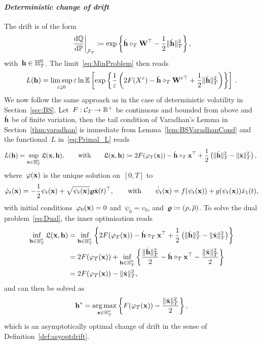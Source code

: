 \paragraph{\textit{Deterministic change of drift}}
The drift is of the form
$$ 
\left.\frac{\D\QQ}{\D\PP}\right|_{\Ff_T} \defEqual \exp\left\{\dot{\hh}\cT \Wf^\top - \frac{1}{2}\|\dot{\hh}\|_{T}^2\right\},
$$
with~$\hh\in \HH_T^0$.
The limit~\eqref{eq:MinProblem} %
then reads
$$
L(\hh) = \limsup_{\eps\downarrow 0}
\eps\ln\EE\left[
\exp\left\{\frac{1}{\eps}\left(2F(X^{\eps}) - \dot{\hh}\cT \Wf^{\eps\top} + \frac{1}{2}\|\dot{\hh}\|_{T}^2\right)\right\}
\right]\,.
$$
We now follow the same approach as in the case of deterministic volatility in Section~\ref{sec:BS}. 
Let~$F:\Cc_T\rightarrow\RR^+$ be continuous and bounded from above and~$\dot{\hh}$ be of finite variation, then the tail condition of Varadhan's Lemma in Section~\ref{thm:varadhan} is immediate from Lemma~\ref{lem:BSVaradhanCond} and 
the functional~$L$ in~\eqref{eq:Primal_L} reads
$$
L(\hh) = \sup\limits_{\xx\in \HH_T^0}
\Lf(\xx,\hh),
\qquad\text{with}\qquad
\Lf(\xx,\hh) \defEqual 2 F(\varphi_T(\xx)) - \dot{\hh}\cT \xx^\top
 + \half\left(\|\dot{\hh}\|_{T}^2 - \|\dot{\xx}\|_{T}^2\right),
~$$
where~$\varphi(\xx)$ is the unique solution on~$[0,T]$ to
$$
\dot{\varphi}_t(\xx) = -\frac{1}{2}\psi_t(\xx) + \sqrt{\psi_t(\xx)}\vrho\dot{\xx}(t)^\top,
\qquad\text{with}\qquad
\dot{\psi}_t(\xx) = f(\psi_t(\xx)) + g(\psi_t(\xx)) \dot{x}_1(t), %
$$
with initial conditions~$\varphi_0(\xx) = 0$ and~$\psi_0 = v_0$, and~$\vrho\defEqual(\rho, \brho)$. 
To solve the dual problem~\eqref{eq:Dual}, the inner optimisation reads
\begin{align*}
\inf_{\hh\in\HH_T^0}\Lf(\xx,\hh) &= \inf_{\hh\in\HH_T^0} \left\{2F(\varphi_T(\xx)) - \dot{\hh}\cT \xx^\top
 + \half\left(\|\dot{\hh}\|_{T}^2 - \|\dot{\xx}\|_{T}^2\right)\right\} \\
&= 2F(\varphi_T(\xx)) + \inf_{\hh\in\HH_T^0}\left\{\frac{\|\dot{\hh}\|_{T}^2}{2} -\dot{\hh}\cT \xx^\top - \frac{\|\dot{\xx}\|_{T}^2}{2}\right\} \\
&= 2F(\varphi_T(\xx)) - \|\dot{\xx}\|_{T}^2,
\end{align*}
and can then be solved as 
\begin{equation}\label{eq:detoptdrift_dual}
\hh^* = \argmax\limits_{\xx\in \HH_T^0} 
\left\{F(\varphi_T(\xx)) - \frac{\|\dot{\xx}\|_{T}^2}{2}\right\},
\end{equation}
which is an asymptotically optimal change of drift in the sense of Definition~\ref{def:asyoptdrift}.\\

